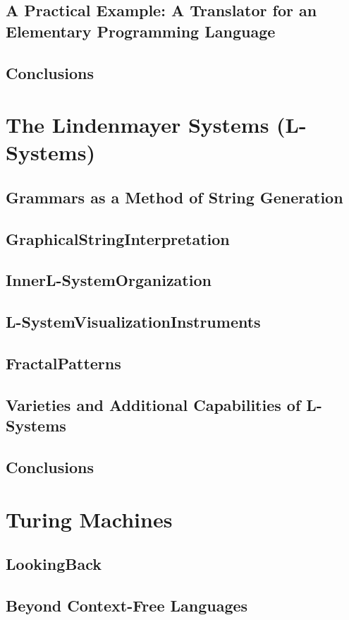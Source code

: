\documentclass[a4paper]{article}
\begin{document}
\subsection{A Practical Example: A Translator for an Elementary Programming Language}
\subsection{Conclusions}

\newpage
\section{The Lindenmayer Systems (L-Systems)}
\subsection{Grammars as a Method of String Generation}
\subsection{GraphicalStringInterpretation}
\subsection{InnerL-SystemOrganization}
\subsection{L-SystemVisualizationInstruments}
\subsection{FractalPatterns}
\subsection{Varieties and Additional Capabilities of L-Systems}
\subsection{Conclusions}

\newpage
\section{Turing Machines}
\subsection{LookingBack}
\subsection{Beyond Context-Free Languages}
\end{document}
